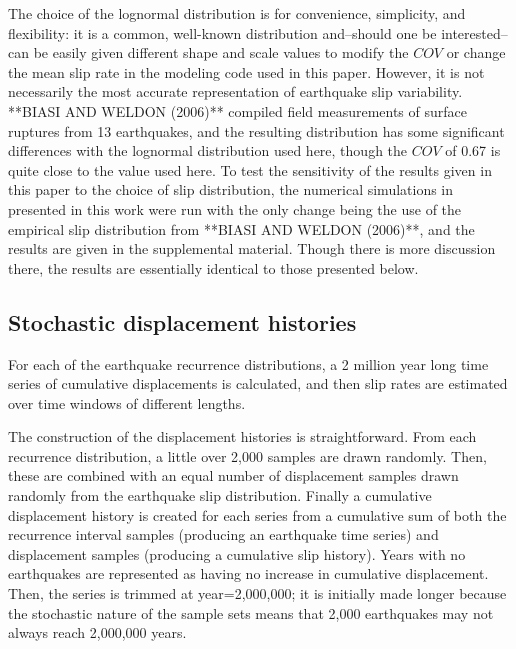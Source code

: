 \documentclass[se, manuscript]{copernicus}
\begin{document}
The choice of the lognormal distribution is for convenience, simplicity, and
flexibility: it is a common, well-known distribution and--should one be
interested--can be easily given different shape and scale values to modify the
\(COV\) or change the mean slip rate in the modeling code used in this paper.
However, it is not necessarily the most accurate representation of earthquake
slip variability. **BIASI AND WELDON (2006)** compiled field measurements of
surface ruptures from 13 earthquakes, and the resulting distribution has some
significant differences with the lognormal distribution used here, though the
\(COV\) of 0.67 is quite close to the value used here. To test the
sensitivity of the results given in this paper to the choice of slip
distribution, the numerical simulations in presented in this work were run with
the only change being the use of the empirical slip distribution from **BIASI
AND WELDON (2006)**, and the results are given in the supplemental material.
Though there is more discussion there, the results are essentially identical to
those presented below.

\subsection{Stochastic displacement
histories}\label{stochastic-displacement-histories}

For each of the earthquake recurrence distributions, a 2 million year
long time series of cumulative displacements is calculated, and then
slip rates are estimated over time windows of different lengths.

The construction of the displacement histories is straightforward. From
each recurrence distribution, a little over 2,000 samples are drawn
randomly. Then, these are combined with an equal number of displacement
samples drawn randomly from the earthquake slip distribution. Finally a
cumulative displacement history is created for each series from a
cumulative sum of both the recurrence interval samples (producing an
earthquake time series) and displacement samples (producing a cumulative
slip history). Years with no earthquakes are represented as having no
increase in cumulative displacement. Then, the series is trimmed at
year=2,000,000; it is initially made longer because the stochastic
nature of the sample sets means that 2,000 earthquakes may not always
reach 2,000,000 years.
\end{document}
